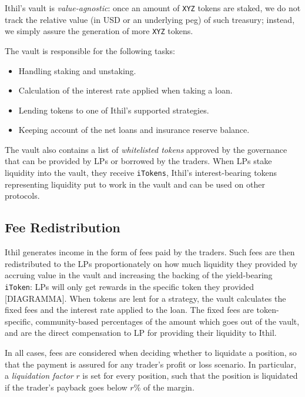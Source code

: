 \documentclass[a4paper,10 pt]{article}
\theoremstyle{definition}
\begin{document}
Ithil's vault is \textit{value-agnostic}: once an amount of \verb|XYZ| tokens are staked, we do not track the relative value (in USD or an underlying peg) of such treasury; instead, we simply assure the generation of more \verb|XYZ| tokens.

The vault is responsible for the following tasks:
\begin{itemize}
\item Handling staking and unstaking.
\item Calculation of the interest rate applied when taking a loan.
\item Lending tokens to one of Ithil’s supported strategies.
\item Keeping account of the net loans and insurance reserve balance.
\end{itemize}

The vault also contains a list of {\it whitelisted tokens} approved by the governance that can be provided by LPs or borrowed by the traders. When LPs stake liquidity into the vault, they receive \verb|iTokens|, Ithil's interest-bearing tokens representing liquidity put to work in the vault and can be used on other protocols.

\subsection{Fee Redistribution}

Ithil generates income in the form of fees paid by the traders. Such fees are then redistributed to the LPs proportionately on how much liquidity they provided by accruing value in the vault and increasing the backing of the yield-bearing \verb|iToken|: LPs will only get rewards in the specific token they provided [DIAGRAMMA]. When tokens are lent for a strategy, the vault calculates the fixed fees and the interest rate applied to the loan. The fixed fees are token-specific, community-based percentages of the amount which goes out of the vault, and are the direct compensation to LP for providing their liquidity to Ithil. 

In all cases, fees are considered when deciding whether to liquidate a position, so that the payment is assured for any trader's profit or loss scenario. In particular, a \textit{liquidation factor} $r$ is set for every position, such that the position is liquidated if the trader's payback goes below $r$\% of the margin.
\end{document}
